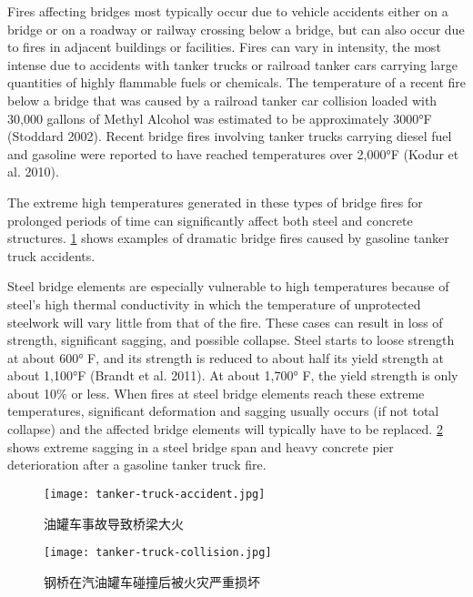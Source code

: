 Fires affecting bridges most typically occur due to vehicle accidents either on a bridge or on a roadway or
railway crossing below a bridge, but can also occur due to fires in adjacent buildings or facilities. Fires can vary in
intensity, the most intense due to accidents with tanker trucks or railroad tanker cars carrying large quantities of
highly flammable fuels or chemicals. The temperature of a recent fire below a bridge that was caused by a railroad
tanker car collision loaded with 30,000 gallons of Methyl Alcohol was estimated to be approximately 3000°F
(Stoddard 2002). Recent bridge fires involving tanker trucks carrying diesel fuel and gasoline were reported to have
reached temperatures over 2,000°F (Kodur et al. 2010).

The extreme high temperatures generated in these types of bridge fires for prolonged periods of time can significantly affect both steel and concrete structures. \cref{fig:tanker-truck-accident} shows examples of dramatic bridge fires caused by gasoline tanker truck accidents.

Steel bridge elements are especially vulnerable to high temperatures because of steel’s high thermal conductivity in which the temperature of unprotected steelwork will vary little from that of the fire. These cases can result in loss of strength, significant sagging, and possible collapse. Steel starts to loose strength at about 600° F, and its strength is reduced to about half its yield strength at about 1,100°F (Brandt et al. 2011). At about 1,700° F, the yield strength is only about 10\% or less. When fires at steel bridge elements reach these extreme temperatures, significant deformation and sagging usually occurs (if not total collapse) and the affected bridge elements will typically have to be replaced. \cref{fig:tanker-truck-collision} shows extreme sagging in a steel bridge span and heavy concrete pier deterioration after a gasoline tanker truck fire.

\begin{figure}
  \texttt{[image: tanker-truck-accident.jpg]}
  \caption{油罐车事故导致桥梁大火}
  \label{fig:tanker-truck-accident}
\end{figure}
\begin{figure}
  \texttt{[image: tanker-truck-collision.jpg]}
  \caption{钢桥在汽油罐车碰撞后被火灾严重损坏}
  \label{fig:tanker-truck-collision}
\end{figure}

